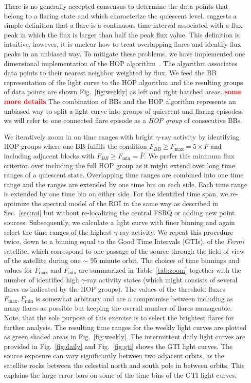 \documentclass[twocolumn,linenumbers]{aastex62}
\newcommand{\gray}{$\gamma$-ray\xspace}
\newcommand{\Fermi}{\emph{Fermi}\xspace}
\newcommand{\todo}[1]{\textbf{\textcolor{red}{#1}}}
\begin{document}
There is no generally accepted consensus to determine the data points that belong to a flaring state and which characterize the quiescent level. \citet{2013MNRAS.430.1324N} suggests a simple definition that a flare is a continuous time interval associated with a flux peak in which the flux is larger than half the peak flux value. 
This definition is intuitive, however, it is unclear how to treat overlapping flares and identify flux peaks in an unbiased way. To mitigate these problems, we have implemented one dimensional implementation of the HOP algorithm~\citep{1998ApJ...498..137E}.
The algorithm associates data points to their nearest neighbor weighted by flux.
We feed the BB representation of the light curve to the HOP algorithm and the resulting groups of data points are shown 
Fig.~\ref{fig:weekly} as left and right hatched areas. \todo{some more details}
The combination of BBs and the HOP algorithm represents an unbiased way to split a light curve into groups of quiescent and flaring episodes; we will refer to one connected flare episode as a \emph{HOP group} of consecutive BBs.

We iteratively zoom in on time ranges with bright \gray activity by identifying HOP groups where one BB fulfills the condition $F_{BB} \geqslant F_\mathrm{max} =  5\times\overline{F}$ and including adjacent blocks with $F_{BB} \geqslant F_\mathrm{min} = \overline{F}$. We prefer this minimum flux criterion over including the full HOP group as it might extend over long time ranges of a quiescent state.
Overlapping time ranges are combined into one time range and the ranges are extended by one time bin on each side. Each time range is extended by one time bin on either side.
For the identified time span, we re-optimize the spectral model of the ROI in the same way as described in Sec.~\ref{sec:roi} but without re-localizing the central FSRQ or adding new point sources. Subsequently, we calculate a light curve with finer binning and again select the time ranges of the highest \gray activity. We repeat this procedure twice, down to a binning equal to the Good Time Intervals (GTIs), of the \Fermi satellite, which correspond to one passage of the source through the field of view of the satellite during one $\sim$ 95 minute orbit.
The choices of time binnings and values for $F_\mathrm{max}$ and $F_\mathrm{min}$ are summarized in Table~\ref{tab:zoom} together with the number of identified high \gray activity states (which might consists of several flares as indicated by the HOP groups).
The values of the threshold fluxes $F_\mathrm{max}, F_\mathrm{min}$ is somewhat arbitrary and are a compromise between including as many flares as possible but keeping the overall number of flares manageable. Note, that the sole purpose of this exercise is to select the brightest flares for  further analysis. 
The resulting time ranges for the weekly light curves are plotted as green shaded areas in Fig.~\ref{fig:weekly}.
The intermittent daily light curves are provided in Fig.~\ref{fig:daily} and  Fig.~\ref{fig:gti} shows the GTI light curves. 
The source exposure can vary significantly between two adjacent orbits, as the satellite rocks between the celestial north and south pole in between orbits. This explains the large error bars on some of the time bins of the GTI light curves.
\end{document}
